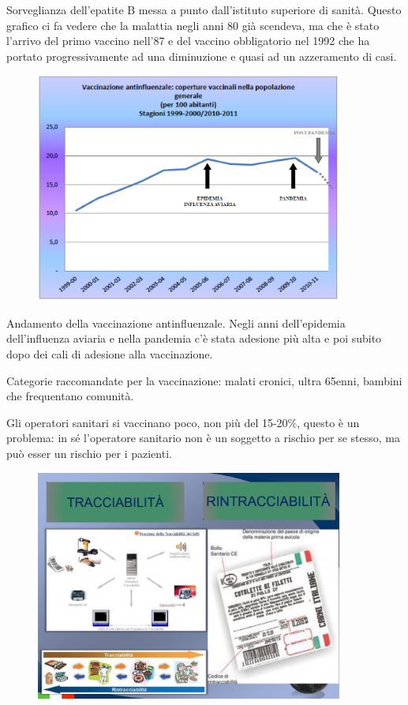 Sorveglianza dell'epatite B messa a punto dall'istituto superiore di
sanità. Questo grafico ci fa vedere che la malattia negli anni 80 già
scendeva, ma che è stato l'arrivo del primo vaccino nell'87 e del
vaccino obbligatorio nel 1992 che ha portato progressivamente ad una
diminuzione e quasi ad un azzeramento di casi.
\begin{figure}[!ht]
\centering
	\includegraphics[width=0.9\textwidth]{02/image12.png}
\end{figure}


Andamento della vaccinazione antinfluenzale. Negli anni dell'epidemia
dell'influenza aviaria e nella pandemia c'è stata adesione più alta e
poi subito dopo dei cali di adesione alla vaccinazione.

Categorie raccomandate per la vaccinazione: malati cronici, ultra
65enni, bambini che frequentano comunità.

Gli operatori sanitari si vaccinano poco, non più del 15-20\%, questo è
un problema: in sé l'operatore sanitario non è un soggetto a rischio per
se stesso, ma può esser un rischio per i pazienti.
\begin{figure}[!ht]
\centering
	\includegraphics[width=0.9\textwidth]{02/image13.png}
\end{figure}


